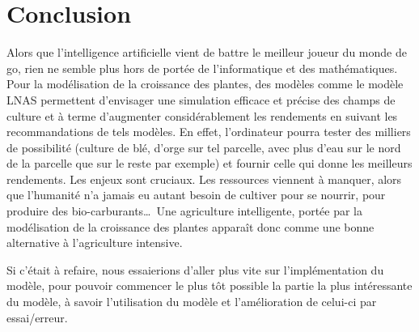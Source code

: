 \section*{Conclusion}

Alors que l'intelligence artificielle vient de battre le meilleur joueur du monde de go, rien ne semble plus hors de portée de l'informatique et des mathématiques. 
Pour la modélisation de la croissance des plantes, des modèles comme le modèle LNAS permettent d'envisager une simulation efficace et précise des champs de culture et à terme d'augmenter considérablement les rendements en suivant les recommandations de tels modèles. En effet, l'ordinateur pourra tester des milliers de possibilité (culture de blé, d'orge sur tel parcelle, avec plus d'eau sur le nord de la parcelle que sur le reste par exemple) et fournir celle qui donne les meilleurs rendements. 
Les enjeux sont cruciaux. Les ressources viennent à manquer, alors que l'humanité n'a jamais eu autant besoin de cultiver pour se nourrir, pour produire des bio-carburants\dots ~Une agriculture intelligente, portée par la modélisation de la croissance des plantes apparaît donc comme une bonne alternative à l'agriculture intensive.


Si c'était à refaire, nous essaierions d'aller plus vite sur l'implémentation du modèle, pour pouvoir commencer le plus tôt possible la partie la plus intéressante du modèle, à savoir l'utilisation du modèle et l'amélioration de celui-ci par essai/erreur.


